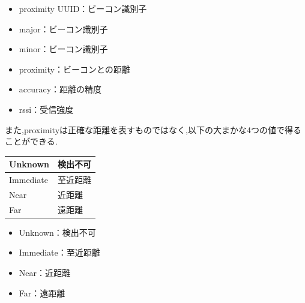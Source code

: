 \begin{itemize}
\item proximity UUID：ビーコン識別子
\item major：ビーコン識別子
\item minor：ビーコン識別子
\item proximity：ビーコンとの距離
\item accuracy：距離の精度
\item rssi：受信強度
\end{itemize}

また,proximityは正確な距離を表すものではなく,以下の大まかな4つの値で得ることができる.

\begin{center}
\begin{table}[htb]
\begin{tabular}{|l|l|} \hline
Unknown & 検出不可 \\ \hline
Immediate & 至近距離 \\ \hline
Near & 近距離 \\ \hline
Far & 遠距離 \\ \hline
\end{tabular}
\end{table}
\end{center}

\begin{itemize}
\item Unknown：検出不可
\item Immediate：至近距離
\item Near：近距離
\item Far：遠距離
\end{itemize}
